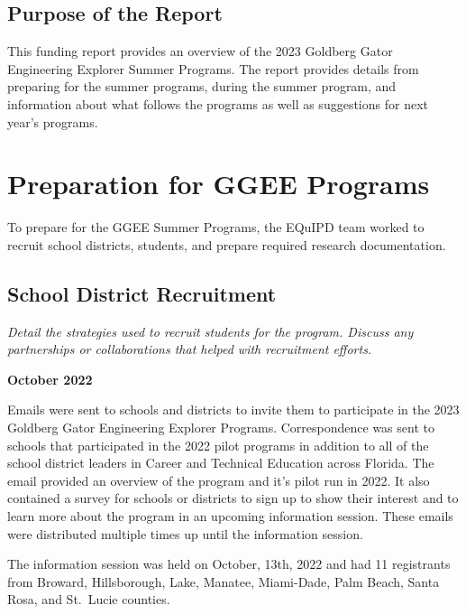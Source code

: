 \documentclass[
]{article}
\begin{document}
\hypertarget{purpose-of-the-report}{%
\subsection{Purpose of the Report}\label{purpose-of-the-report}}

This funding report provides an overview of the 2023 Goldberg Gator
Engineering Explorer Summer Programs. The report provides details from
preparing for the summer programs, during the summer program, and
information about what follows the programs as well as suggestions for
next year's programs.

\hypertarget{preparation-for-ggee-programs}{%
\section{Preparation for GGEE
Programs}\label{preparation-for-ggee-programs}}

To prepare for the GGEE Summer Programs, the EQuIPD team worked to
recruit school districts, students, and prepare required research
documentation.

\hypertarget{school-district-recruitment}{%
\subsection{School District
Recruitment}\label{school-district-recruitment}}

\emph{Detail the strategies used to recruit students for the program.
Discuss any partnerships or collaborations that helped with recruitment
efforts.}

\textbf{October 2022}

Emails were sent to schools and districts to invite them to participate
in the 2023 Goldberg Gator Engineering Explorer Programs. Correspondence
was sent to schools that participated in the 2022 pilot programs in
addition to all of the school district leaders in Career and Technical
Education across Florida. The email provided an overview of the program
and it's pilot run in 2022. It also contained a survey for schools or
districts to sign up to show their interest and to learn more about the
program in an upcoming information session. These emails were
distributed multiple times up until the information session.

The information session was held on October, 13th, 2022 and had 11
registrants from Broward, Hillsborough, Lake, Manatee, Miami-Dade, Palm
Beach, Santa Rosa, and St.~Lucie counties.
\end{document}
